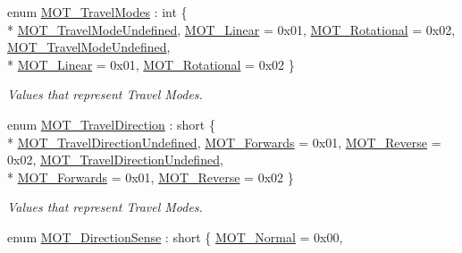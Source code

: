 \begin{DoxyCompactItemize}
\item 
enum \hyperlink{group___common_ga6ba6123918e8f35d6fef7daf9dbd11d4}{M\+O\+T\+\_\+\+Travel\+Modes} \+: int \{ \\*
\hyperlink{group___common_gga6ba6123918e8f35d6fef7daf9dbd11d4abbde058aa7397580f982fce0c6dbde78}{M\+O\+T\+\_\+\+Travel\+Mode\+Undefined}, 
\hyperlink{group___common_gga6ba6123918e8f35d6fef7daf9dbd11d4a51e3be0b3b203122cc8860458ab2f2ca}{M\+O\+T\+\_\+\+Linear} = 0x01, 
\hyperlink{group___common_gga6ba6123918e8f35d6fef7daf9dbd11d4a61adb90b042f53820ab0c228b61834d7}{M\+O\+T\+\_\+\+Rotational} = 0x02, 
\hyperlink{group___common_gga6ba6123918e8f35d6fef7daf9dbd11d4abbde058aa7397580f982fce0c6dbde78}{M\+O\+T\+\_\+\+Travel\+Mode\+Undefined}, 
\\*
\hyperlink{group___common_gga6ba6123918e8f35d6fef7daf9dbd11d4a51e3be0b3b203122cc8860458ab2f2ca}{M\+O\+T\+\_\+\+Linear} = 0x01, 
\hyperlink{group___common_gga6ba6123918e8f35d6fef7daf9dbd11d4a61adb90b042f53820ab0c228b61834d7}{M\+O\+T\+\_\+\+Rotational} = 0x02
 \}\begin{DoxyCompactList}\small\item\em Values that represent Travel Modes. \end{DoxyCompactList}
\item 
enum \hyperlink{group___common_ga70a2a2ac296464f3d846c30d71d18daa}{M\+O\+T\+\_\+\+Travel\+Direction} \+: short \{ \\*
\hyperlink{group___common_gga70a2a2ac296464f3d846c30d71d18daaaf643e125179354cc673e0644ce015703}{M\+O\+T\+\_\+\+Travel\+Direction\+Undefined}, 
\hyperlink{group___common_gga70a2a2ac296464f3d846c30d71d18daaacb8d98775e587f29a0328a5875b092cd}{M\+O\+T\+\_\+\+Forwards} = 0x01, 
\hyperlink{group___common_gga70a2a2ac296464f3d846c30d71d18daaa6b9608a57ff49d06b450236c54dd5b76}{M\+O\+T\+\_\+\+Reverse} = 0x02, 
\hyperlink{group___common_gga70a2a2ac296464f3d846c30d71d18daaaf643e125179354cc673e0644ce015703}{M\+O\+T\+\_\+\+Travel\+Direction\+Undefined}, 
\\*
\hyperlink{group___common_gga70a2a2ac296464f3d846c30d71d18daaacb8d98775e587f29a0328a5875b092cd}{M\+O\+T\+\_\+\+Forwards} = 0x01, 
\hyperlink{group___common_gga70a2a2ac296464f3d846c30d71d18daaa6b9608a57ff49d06b450236c54dd5b76}{M\+O\+T\+\_\+\+Reverse} = 0x02
 \}\begin{DoxyCompactList}\small\item\em Values that represent Travel Modes. \end{DoxyCompactList}
\item 
enum \hyperlink{group___common_ga8e20138f47b000995f254ee6262f89d8}{M\+O\+T\+\_\+\+Direction\+Sense} \+: short \{ \hyperlink{group___common_gga8e20138f47b000995f254ee6262f89d8a97191fb7d9f28808868a1e52c4365bd3}{M\+O\+T\+\_\+\+Normal} = 0x00, 

\end{DoxyCompactItemize}
